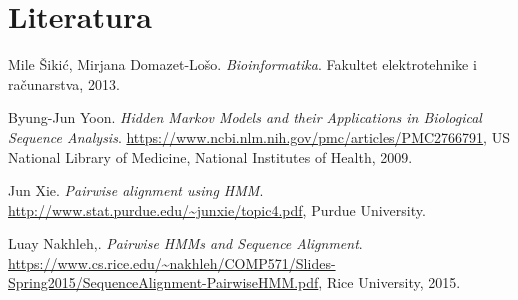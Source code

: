 \documentclass[a4paper]{article}
\begin{document}
\section{Literatura}
\renewcommand{\section}[2]{}%
\begin{thebibliography}{}

Mile Šikić, Mirjana Domazet-Lošo. 
\textit{Bioinformatika}.
 Fakultet elektrotehnike i računarstva,  2013.

Byung-Jun Yoon. 
\textit{Hidden Markov Models and their Applications in Biological Sequence Analysis}.
\url{https://www.ncbi.nlm.nih.gov/pmc/articles/PMC2766791}, 
 US National Library of Medicine, National Institutes of Health, 2009.


Jun Xie. 
\textit{Pairwise alignment using HMM}.
\url{http://www.stat.purdue.edu/~junxie/topic4.pdf},
 Purdue University.

Luay Nakhleh,. 
\textit{Pairwise HMMs and Sequence Alignment}.
\url{https://www.cs.rice.edu/~nakhleh/COMP571/Slides-Spring2015/SequenceAlignment-PairwiseHMM.pdf},
 Rice University, 2015.

\end{thebibliography}
\end{document}
